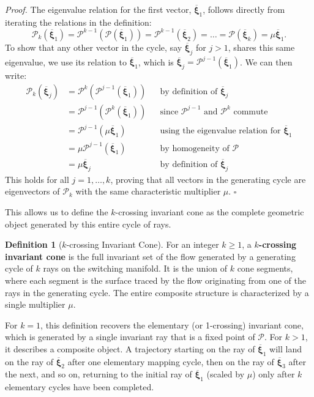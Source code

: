 \documentclass[a4paper,9pt,parskip=half,english]{article}
\theoremstyle{plain}
\theoremstyle{definition}
\newtheorem{definition}{Definition}
\newcommand{\vxi}{\bm{\xi}}
\begin{document}
\textit{Proof.} The eigenvalue relation for the first vector, $\overline{\vxi}_1$, follows directly from iterating the relations in the definition:
\begin{equation*}
	\mathcal{P}_k(\overline{\vxi}_1) = \mathcal{P}^{k-1}(\mathcal{P}(\overline{\vxi}_1)) = \mathcal{P}^{k-1}(\overline{\vxi}_2) = \dots = \mathcal{P}(\overline{\vxi}_k) = \mu \overline{\vxi}_1.
\end{equation*}
To show that any other vector in the cycle, say $\overline{\vxi}_j$ for $j>1$, shares this same eigenvalue, we use its relation to $\overline{\vxi}_1$, which is $\overline{\vxi}_j = \mathcal{P}^{j-1}(\overline{\vxi}_1)$. We can then write:
\begin{align*}
	\mathcal{P}_k(\overline{\vxi}_j) &= \mathcal{P}^k(\mathcal{P}^{j-1}(\overline{\vxi}_1)) &&\text{by definition of } \overline{\vxi}_j \\
	&= \mathcal{P}^{j-1}(\mathcal{P}^k(\overline{\vxi}_1)) &&\text{since } \mathcal{P}^{j-1} \text{ and } \mathcal{P}^k \text{ commute} \\
	&= \mathcal{P}^{j-1}(\mu \overline{\vxi}_1) &&\text{using the eigenvalue relation for } \overline{\vxi}_1 \\
	&= \mu \mathcal{P}^{j-1}(\overline{\vxi}_1) &&\text{by homogeneity of } \mathcal{P} \\
	&= \mu \overline{\vxi}_j &&\text{by definition of } \overline{\vxi}_j
\end{align*}
This holds for all $j=1, \dots, k$, proving that all vectors in the generating cycle are eigenvectors of $\mathcal{P}_k$ with the same characteristic multiplier $\mu$. \hfill $\square$

This allows us to define the $k$-crossing invariant cone as the complete geometric object generated by this entire cycle of rays.

\begin{definition}[$k$-crossing Invariant Cone]
	For an integer $k \ge 1$, a \textbf{$k$-crossing invariant cone} is the full invariant set of the flow generated by a generating cycle of $k$ rays on the switching manifold. It is the union of $k$ cone segments, where each segment is the surface traced by the flow originating from one of the rays in the generating cycle. The entire composite structure is characterized by a single multiplier $\mu$.
\end{definition}

For $k=1$, this definition recovers the elementary (or 1-crossing) invariant cone, which is generated by a single invariant ray that is a fixed point of $\mathcal{P}$. For $k>1$, it describes a composite object. A trajectory starting on the ray of $\overline{\vxi}_1$ will land on the ray of $\overline{\vxi}_2$ after one elementary mapping cycle, then on the ray of $\overline{\vxi}_3$ after the next, and so on, returning to the initial ray of $\overline{\vxi}_1$ (scaled by $\mu$) only after $k$ elementary cycles have been completed.
\end{document}

